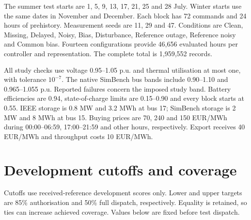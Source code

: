 \documentclass[11pt]{article}
\begin{document}
The summer test starts are 1, 5, 9, 13, 17, 21, 25 and 28 July. Winter starts use the same dates in November and December. Each block has 72 commands and 24 hours of prehistory. Measurement seeds are 11, 29 and 47. Conditions are Clean, Missing, Delayed, Noisy, Bias, Disturbance, Reference outage, Reference noisy and Common bias. Fourteen configurations provide 46,656 evaluated hours per controller and representation. The complete total is 1,959,552 records.

All study checks use voltage 0.95--1.05 p.u. and thermal utilisation at most one, with tolerance $10^{-7}$. The native SimBench bus bands include 0.90--1.10 and 0.965--1.055 p.u. Reported failures concern the imposed study band. Battery efficiencies are 0.94, state-of-charge limits are 0.15--0.90 and every block starts at 0.55. IEEE storage is 0.8 MW and 3.2 MWh at bus 17; SimBench storage is 2 MW and 8 MWh at bus 15. Buying prices are 70, 240 and 150 EUR/MWh during 00:00--06:59, 17:00--21:59 and other hours, respectively. Export receives 40 EUR/MWh and throughput costs 10 EUR/MWh.
\section{Development cutoffs and coverage}
Cutoffs use received-reference development scores only. Lower and upper targets are 85\% authorisation and 50\% full dispatch, respectively. Equality is retained, so ties can increase achieved coverage. Values below are fixed before test dispatch.
\end{document}
